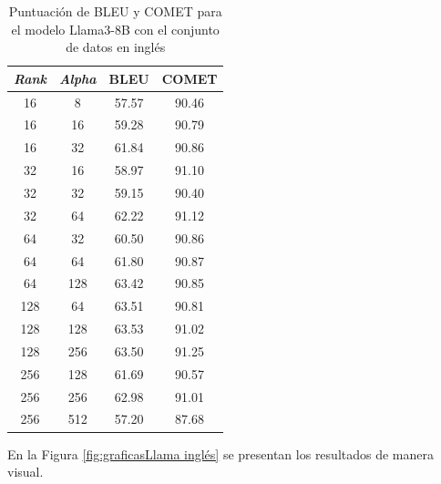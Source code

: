 \documentclass[11pt,spanish,listoffigures,listoftables]{tfgetsinf}
\begin{document}
\begin{table}[!h]
\caption{Puntuación de BLEU y COMET para el modelo Llama3-8B con el conjunto de datos en inglés}
\begin{center}
\begin{tabular}{ c c | c c }
	\hline
	\textit{Rank} & \textit{Alpha} & BLEU & COMET \\
	\hline
	\hline
	16 & 8 & 57.57 & 90.46 \\
	16 & 16 & 59.28 & 90.79 \\
	16 & 32 & 61.84 & 90.86 \\
	\hline
	32 & 16 & 58.97 & 91.10 \\
	32 & 32 & 59.15 & 90.40 \\
	32 & 64 &  62.22 & 91.12 \\
	\hline
	64 & 32 & 60.50 & 90.86\\
	64 & 64 & 61.80 & 90.87\\
	64 & 128 & 63.42 & 90.85\\
	\hline
	128 & 64 & 63.51 & 90.81\\
	128 & 128 & 63.53 & 91.02\\
	128 & 256 & 63.50 & 91.25\\
	\hline
	256 & 128 & 61.69 & 90.57\\
	256 & 256 & 62.98 & 91.01\\
	256 & 512 & 57.20 & 87.68\\	

\end{tabular}
\end{center}
\label{tab: Llama exploración de alpha inglés}
\end{table}

En la Figura \ref{fig:graficasLlama inglés} se presentan los resultados de manera visual.
\end{document}
